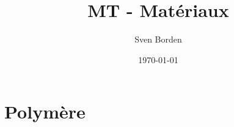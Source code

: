 \documentclass[12pt]{report}
\title{MT - Matériaux}
\author{Sven Borden}
\date{\today}
\begin{document}
	\maketitle	
	\tableofcontents
	\clearpage

	\chapter{Polymère}	
	
\end{document}
